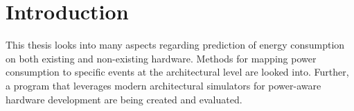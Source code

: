 \chapter{Introduction}

This thesis looks into many aspects regarding prediction of energy consumption
on both existing and non-existing hardware. Methods for mapping power
consumption to specific events at the architectural level are looked into.
Further, a program that leverages modern architectural simulators for
power-aware hardware development are being created and evaluated.







